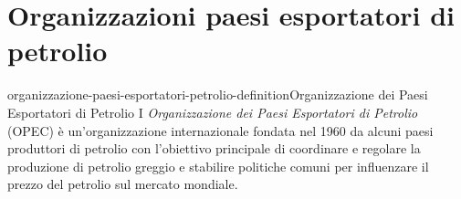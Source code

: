 \documentclass[preview]{standalone}
\begin{document}
\genpage

\section{Organizzazioni paesi esportatori di petrolio}

\begin{snippetdefinition}{organizzazione-paesi-esportatori-petrolio-definition}{Organizzazione dei Paesi Esportatori di Petrolio}
    I \textit{Organizzazione dei Paesi Esportatori di Petrolio} (OPEC)
    è un'organizzazione internazionale fondata nel 1960 da alcuni paesi
    produttori di petrolio con l'obiettivo principale di coordinare e
    regolare la produzione di petrolio greggio e stabilire politiche
    comuni per influenzare il prezzo del petrolio sul mercato mondiale.
\end{snippetdefinition}
\end{document}
